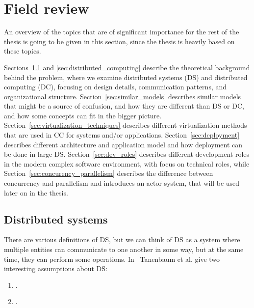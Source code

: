 \chapter{Field review}\label{chapter:Field_overview}
%
An overview of the topics that are of significant importance for the rest of the thesis is going to be given in this section, since the thesis is heavily based on these topics. 

Sections~\ref{sec:distributed_systems} and \ref{sec:distributed_computing} describe the theoretical background behind the problem, where we examine distributed systems (DS) and distributed computing (DC), focusing on design details, communication patterns, and organizational structure. Section~\ref{sec:similar_models} describes similar models that might be a source of confusion, and how they are different than DS or DC, and how some concepts can fit in the bigger picture. Section~\ref{sec:virtualization_techniques} describes different virtualization methods that are used in CC for systems and/or applications. Section~\ref{sec:deployment} describes different architecture and application model and how deployment can be done in large DS. Section~\ref{sec:dev_roles} describes different development roles in the modern complex software environment, with focus on technical roles, while Section~\ref{sec:concurency_parallelism} describes the difference between concurrency and parallelism and introduces an actor system, that will be used later on in the thesis. 

\section{Distributed systems}\label{sec:distributed_systems}
%
There are various definitions of DS, but we can think of DS as a system where multiple entities can communicate to one another in some way, but at the same time, they can perform some operations. In~\cite{SteenT16, 0019513} Tanenbaum et al. give two interesting assumptions about DS:

\begin{enumerate}[start=1,label={(\bfseries \arabic*)}]
	\item  {}.
	\item {}.\label{ds:asumption_2}
\end{enumerate}

